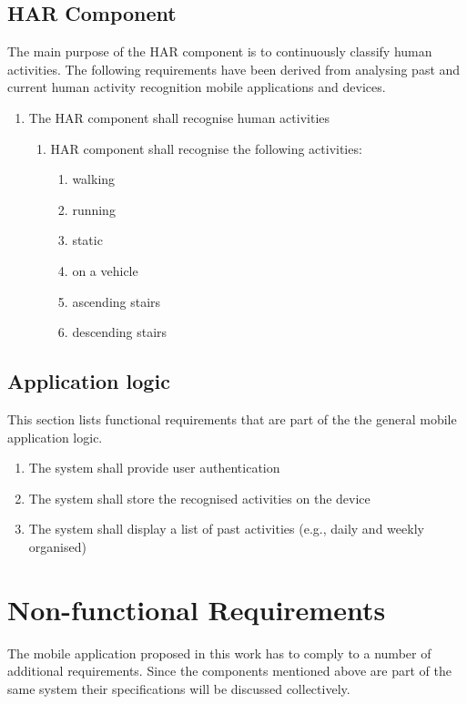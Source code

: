    
    \subsection{HAR Component}
    The main purpose of the HAR component is to continuously classify human activities. The following requirements have been derived from analysing past and current human activity recognition mobile applications and devices.
    
    \begin{enumerate}
        \item The HAR component shall recognise human activities
        \begin{enumerate}
            \item HAR component shall recognise the following activities:
            \begin{enumerate}
                \item walking
                \item running
                \item static
                \item on a vehicle
                \item ascending stairs
                \item descending stairs
            \end{enumerate}
        \end{enumerate}
    \end{enumerate}
    
    \subsection{Application logic}
    This section lists functional requirements that are part of the the general mobile application logic.
    \begin{enumerate}
        \item The system shall provide user authentication
        \item The system shall store the recognised activities on the device
        \item The system shall display a list of past activities (e.g., daily and weekly organised)
    \end{enumerate}

\section{Non-functional Requirements}
The mobile application proposed in this work has to comply to a number of additional requirements. Since the components mentioned above are part of the same system their specifications will be discussed collectively.


